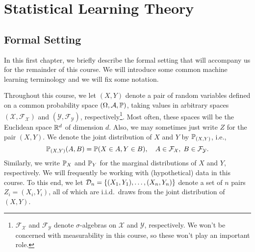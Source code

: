 \part{Statistical Learning Theory}

\chapter{Formal Setting}
\label{ch: formal setting}

In this first chapter, we briefly describe the formal setting that will accompany us for the remainder of this course. We will introduce some common machine learning terminology and we will fix some notation.

Throughout this course, we let $(X, Y)$ denote a pair of random variables defined on a common probability space $(\Omega, \mathcal{A}, \P)$, taking values in arbitrary spaces $(\mathcal{X}, \mathcal{F}_{\mathcal{X}})$ and $(\mathcal{Y}, \mathcal{F}_{\mathcal{Y}})$, respectively\footnote{$\mathcal{F}_{\mathcal{X}}$ and $\mathcal{F}_{\mathcal{Y}}$ denote $\sigma$-algebras on $\mathcal{X}$ and $\mathcal{Y}$, respectively. We won't be concerned with measurability in this course, so these won't play an important role.}. Most often, these spaces will be the Euclidean space $\R^d$ of dimension $d$. Also, we may sometimes just write $Z$ for the pair $(X, Y)$. We denote the joint distribution of $X$ and $Y$ by $\P_{(X, Y)}$, i.e.,
\[
    \P_{(X, Y)}(A, B) = \Prob(X \in A, Y \in B), \quad A \in \mathcal{F}_{\mathcal{X}}, \; B \in \mathcal{F}_{\mathcal{Y}}.
\]
Similarly, we write $\P_X$ and $\P_Y$ for the marginal distributions of $X$ and $Y$, respectively. We will frequently be working with (hypothetical) data in this course. To this end, we let $\mathcal{D}_n = \set{(X_1, Y_1), \dots, (X_n, Y_n)}$ denote a set of $n$ pairs $Z_i = (X_i, Y_i)$, all of which are i.i.d.\ draws from the joint distribution of $(X, Y)$.
